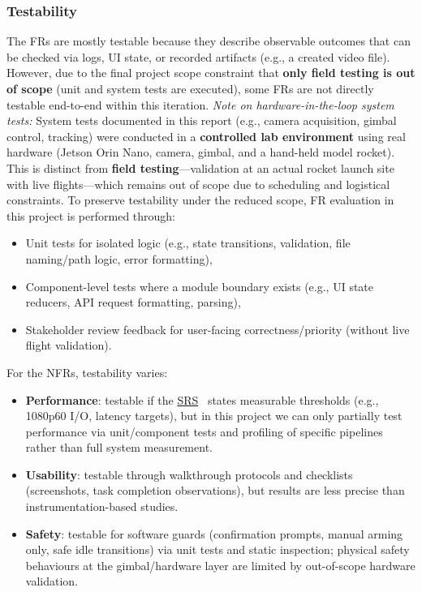 \documentclass[12pt, titlepage]{article}
\newcommand{\SRS}{\href{../SRS/SRS.pdf}{SRS}}
\begin{document}
\subsubsection{Testability}
The FRs are mostly testable because they describe observable outcomes that can
be checked via logs, UI state, or recorded artifacts (e.g., a created video
file). However, due to the final project scope constraint that \textbf{only
  field testing is out of scope} (unit and system tests are executed), some FRs
are not directly testable end-to-end within this iteration. \textit{Note on
  hardware-in-the-loop system tests:} System tests documented in this report
(e.g., camera acquisition, gimbal control, tracking) were conducted in a
\textbf{controlled lab environment} using real hardware (Jetson Orin Nano,
camera, gimbal, and a hand-held model rocket). This is distinct from
\textbf{field testing}---validation at an actual rocket launch site with live
flights---which remains out of scope due to scheduling and logistical
constraints. To preserve testability under the reduced scope, FR evaluation in
this project is performed through:
\begin{itemize}
  \item Unit tests for isolated logic (e.g., state transitions, validation, file
        naming/path logic, error formatting),
  \item Component-level tests where a module boundary exists (e.g., UI state reducers,
        API request formatting, parsing),
  \item Stakeholder review feedback for user-facing correctness/priority (without live
        flight validation).
\end{itemize}
For the NFRs, testability varies:
\begin{itemize}
  \item \textbf{Performance}: testable if the \SRS~\cite{SRS} states measurable thresholds
        (e.g., 1080p60 I/O, latency targets), but in this project we can only
        partially test performance via unit/component tests and profiling of
        specific pipelines rather than full system measurement.
  \item \textbf{Usability}: testable through walkthrough protocols and checklists
        (screenshots, task completion observations), but results are less precise
        than instrumentation-based studies.
  \item \textbf{Safety}: testable for software guards (confirmation prompts,
        manual arming only, safe idle transitions) via unit tests and static
        inspection; physical safety behaviours at the gimbal/hardware layer are
        limited by out-of-scope hardware validation.
\end{itemize}
\end{document}
